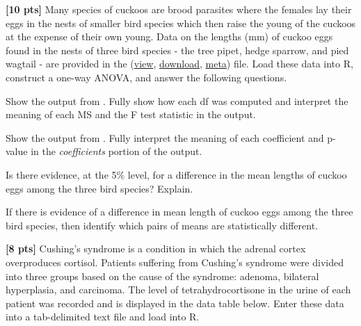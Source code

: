 \documentclass[10pt,openany]{book}\usepackage[]{graphicx}\usepackage[]{color}
\begin{document}
\begin{hwsection}
\newpage
  \item \label{hwprob:LMANOVA1Cuckoo} \textbf{[10 pts]} Many species of cuckoos are brood parasites where the females lay their eggs in the nests of smaller bird species which then raise the young of the cuckoos at the expense of their own young.  Data on the lengths (mm) of cuckoo eggs found in the nests of three bird species - the tree pipet, hedge sparrow, and pied wagtail - are provided in the  (\href{https://github.com/droglenc/NCData/blob/master/Cuckoos.csv}{view}, \href{https://raw.githubusercontent.com/droglenc/NCData/master/Cuckoos.csv}{download}, \href{https://github.com/droglenc/NCData/blob/master/Cuckoos_meta.txt}{meta}) file.  Load these data into R, construct a one-way ANOVA, and answer the following questions.
    \begin{Enumerate}
      \item Show the output from .  Fully show how each df was computed and interpret the meaning of each MS and the F test statistic in the output.
      \item Show the output from .  Fully interpret the meaning of each coefficient and p-value in the \emph{coefficients} portion of the output.
      \item Is there evidence, at the 5\% level, for a difference in the mean lengths of cuckoo eggs among the three bird species?  Explain.
      \item If there is evidence of a difference in mean length of cuckoo eggs among the three bird species, then identify which pairs of means are statistically different.
    \end{Enumerate}

\vspace{18pt}
  \item \label{hwprob:LMANOVA1Cushings1} \textbf{[8 pts]} Cushing's syndrome is a condition in which the adrenal cortex overproduces cortisol.  Patients suffering from Cushing's syndrome were divided into three groups based on the cause of the syndrome: adenoma, bilateral hyperplasia, and carcinoma.  The level of tetrahydrocortisone in the urine of each patient was recorded and is displayed in the data table below.  Enter these data into a tab-delimited text file and load into R.


\end{hwsection}
\end{document}
